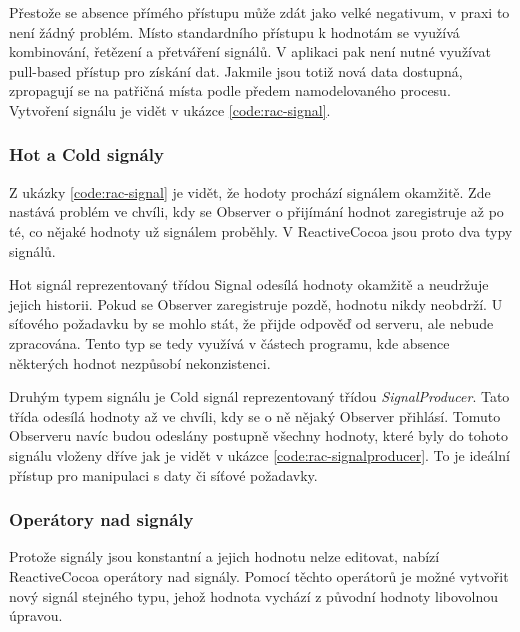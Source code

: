 Přestože se absence přímého přístupu může zdát jako velké negativum, v praxi to není žádný problém.
Místo standardního přístupu k hodnotám se využívá kombinování, řetězení a přetváření signálů.
V aplikaci pak není nutné využívat pull-based přístup pro získání dat.
Jakmile jsou totiž nová data dostupná, zpropagují se na patřičná místa podle předem namodelovaného procesu.
Vytvoření signálu je vidět v ukázce \ref{code:rac-signal}.


\subsubsection*{Hot a Cold signály}

Z ukázky \ref{code:rac-signal} je vidět, že hodoty prochází signálem okamžitě.
Zde nastává problém ve chvíli, kdy se Observer o přijímání hodnot zaregistruje až po té, co nějaké hodnoty už signálem proběhly.
V ReactiveCocoa jsou proto dva typy signálů.

Hot signál reprezentovaný třídou Signal odesílá hodnoty okamžitě a neudržuje jejich historii.
Pokud se Observer zaregistruje pozdě, hodnotu nikdy neobdrží.
U síťového požadavku by se mohlo stát, že přijde odpověď od serveru, ale nebude zpracována.
Tento typ se tedy využívá v částech programu, kde absence některých hodnot nezpůsobí nekonzistenci.

Druhým typem signálu je Cold signál reprezentovaný třídou \textit{SignalProducer}.
Tato třída odesílá hodnoty až ve chvíli, kdy se o ně nějaký Observer přihlásí.
Tomuto Observeru navíc budou odeslány postupně všechny hodnoty, které byly do tohoto signálu vloženy dříve jak je vidět v ukázce \ref{code:rac-signalproducer}.
To je ideální přístup pro manipulaci s daty či síťové požadavky.


\subsubsection*{Operátory nad signály}

Protože signály jsou konstantní a jejich hodnotu nelze editovat, nabízí ReactiveCocoa operátory nad signály.
Pomocí těchto operátorů je možné vytvořit nový signál stejného typu, jehož hodnota vychází z původní hodnoty libovolnou úpravou.

